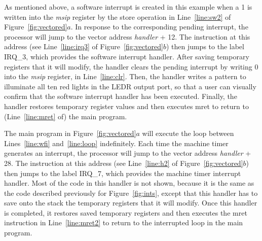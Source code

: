 \documentclass[11pt, twoside, pdftex]{article}
\newcommand{\commonPath}{../../Common}
\begin{document}
As mentioned above, a software interrupt is created in this example when a 1 is written
into the {\it msip} register by the store operation in Line~\ref{line:sw2} of 
Figure~\ref{fig:vectored}$a$. In response to the corresponding pending interrupt,
the processor will jump to the vector address {\it handler} + 12. The instruction at this address
(see Line~\ref{line:irq3} of Figure~\ref{fig:vectored}$b$)
then jumps to the label IRQ\_3, which provides the software interrupt handler. 
After saving temporary registers that it will modify, the handler clears the pending
interrupt by writing 0 into the {\it msip} register, in Line~\ref{line:clr}. Then, the
handler writes a pattern to illuminate all ten red lights in the LEDR output port, so that
a user can visually confirm that the software interrupt handler has been executed.
Finally, the handler restores temporary register values and then executes {\sf mret} to 
return to (Line~\ref{line:mret} of) the main program.

The main program in Figure~\ref{fig:vectored}$a$ will execute the loop between 
Lines~\ref{line:wfi} and~\ref{line:loop} indefinitely. Each time the machine timer
generates an interrupt, the processor will jump to the vector address {\it handler} + 28.
The instruction at this address (see Line~\ref{line:h2} of Figure~\ref{fig:vectored}$b$)
then jumps to the label IRQ\_7, which provides the 
machine timer interrupt handler. Most of the code in this handler is not shown, because it
is the same as the code described previously for Figure~\ref{fig:ints}, except that this
handler has to save onto the stack the temporary registers that it will modify. Once this 
handler is completed, it restores saved temporary registers and then 
executes the {\sf mret} instruction in Line~\ref{line:mret2}
to return to the interrupted loop in the main program.



\end{document}
